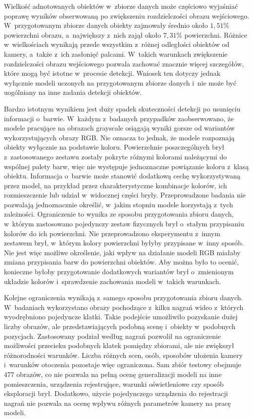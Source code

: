 Wielkość adnotowanych obiektów w~zbiorze danych może częściowo wyjaśniać poprawę wyników obserwowaną po zwiększeniu rozdzielczości obrazu wejściowego. W~przygotowanym zbiorze danych obiekty zajmowały średnio około $1,51\%$ powierzchni obrazu, a~największy z~nich zajął około $7,31\%$ powierzchni. Różnice w~wielkościach wynikają przede wszystkim z~różnej odległości obiektów od kamery, a~także z~ich zasłonięć palcami. W~takich warunkach zwiększenie rozdzielczości obrazu wejściowego pozwala zachować znacznie więcej szczegółów, które mogą być istotne w~procesie detekcji. Wniosek ten dotyczy jednak wyłącznie modeli uczonych na przygotowanym zbiorze danych i~nie może być uogólniany na inne zadania detekcji obiektów.

Bardzo istotnym wynikiem jest duży spadek skuteczności detekcji po usunięciu informacji o~barwie. W~każdym z~badanych przypadków zaobserwowano, że modele pracujące na obrazach grayscale osiągają wyniki gorsze od wariantów wykorzystujących obrazy RGB. Nie oznacza to jednak, że modele rozpoznają obiekty wyłącznie na podstawie koloru. Powierzchnie poszczególnych brył z~zastosowanego zestawu zostały pokryte różnymi kolorami należącymi do wspólnej palety barw, więc nie występuje jednoznaczne powiązanie koloru z~klasą obiektu. Informacja o~barwie może stanowić dodatkową cechę wykorzystywaną przez model, na przykład przez charakterystyczne kombinacje kolorów, ich rozmieszczenie lub udział w~widocznej części bryły. Przeprowadzone badania nie pozwalają jednoznacznie określić, w~jakim stopniu modele korzystają z~tych zależności. Ograniczenie to wynika ze sposobu przygotowania zbioru danych, w~którym zastosowano pojedynczy zestaw fizycznych brył o~stałym przypisaniu kolorów do ich powierzchni. Nie przeprowadzono eksperymentu z~innym zestawem brył, w~którym kolory powierzchni byłyby przypisane w~inny sposób. Nie jest więc możliwe określenie, jaki wpływ na działanie modeli RGB miałaby zmiana przypisania barw do powierzchni obiektów. Aby można było to ocenić, konieczne byłoby przygotowanie dodatkowych wariantów brył o~zmienionym układzie kolorów i~sprawdzenie zachowania modeli w~takich warunkach.

Kolejne ograniczenia wynikają z~samego sposobu przygotowania zbioru danych. W~badaniach wykorzystano obrazy pochodzące z~kilku nagrań wideo z~których wyodrębniono pojedyncze klatki. Takie podejście umożliwiło pozyskanie dużej liczby obrazów, ale przedstawiających podobną scenę i~obiekty w~podobnych pozycjach. Zastosowany podział według nagrań pozwolił na ograniczenie możliwości przecieku podobnych klatek pomiędzy zbiorami, ale nie zwiększył różnorodności warunków. Liczba różnych scen, osób, sposobów ułożenia kamery i~warunków otoczenia pozostaje więc ograniczona. Sam zbiór testowy obejmuje $477$ obrazów, co nie pozwala na pełną ocenę generalizacji modeli na inne pomieszczenia, urządzenia rejestrujące, warunki oświetleniowe czy sposób eksploracji brył. Dodatkowo, użycie pojedynczego urządzenia do rejestracji nagrań nie pozwala na ocenę wpływu różnych parametrów kamery na pracę modeli.

